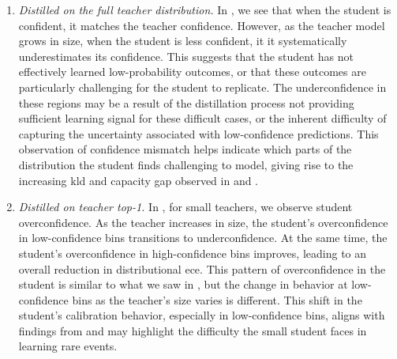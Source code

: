 \begin{enumerate}
  \item \emph{Distilled on the full teacher distribution.} In , we see that when the student is confident, it matches the teacher confidence.
  However, as the teacher model grows in size, 
  when the student is less confident,
  it it systematically underestimates its confidence.
  This suggests that the student has not effectively learned low-probability outcomes, or that these outcomes are particularly challenging for the student to replicate. 
  The underconfidence in these regions may be a result of the distillation process not providing sufficient learning signal for these difficult cases, or the inherent difficulty of capturing the uncertainty associated with low-confidence predictions.
  This observation of confidence mismatch helps indicate which parts of the distribution the student finds challenging to model, giving rise to the increasing \gls{kld} and capacity gap observed in  and .
  \item \emph{Distilled on teacher top-1.} In , for small teachers, we observe student overconfidence.
  As the teacher increases in size, the student's overconfidence in low-confidence bins transitions to underconfidence. 
  At the same time, the student's overconfidence in high-confidence bins improves, leading to an overall reduction in distributional \gls{ece}. 
  This pattern of overconfidence in the student is similar to what we saw in , but the change in behavior at low-confidence bins as the teacher’s size varies is different. 
  This shift in the student's calibration behavior, especially in low-confidence bins, aligns with findings from  and may highlight the difficulty the small student faces in learning rare events.
\end{enumerate}

